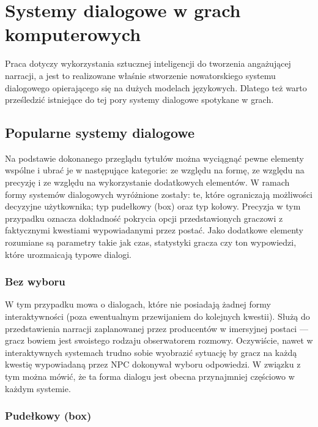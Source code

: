 \graphicspath{{chapters/chapter3/imgs/}}

\chapter{Systemy dialogowe w grach komputerowych}\label{section:ch3}

Praca dotyczy wykorzystania sztucznej inteligencji do tworzenia angażującej narracji, a jest
to realizowane właśnie stworzenie nowatorskiego systemu dialogowego opierającego się
na dużych modelach językowych. Dlatego też warto prześledzić istniejące do tej pory systemy
dialogowe spotykane w grach.

\section{Popularne systemy dialogowe}\label{subsection:ch3_1}

Na podstawie dokonanego przeglądu tytułów można wyciągnąć pewne elementy wspólne i ubrać je
w następujące kategorie: ze względu na formę, ze względu na precyzję i ze względu na wykorzystanie
dodatkowych elementów. W ramach formy systemów dialogowych wyróżnione zostały: te, które ograniczają
możliwości decyzyjne użytkownika; typ pudełkowy (box) oraz typ kołowy. Precyzja w tym przypadku
oznacza dokładność pokrycia opcji przedstawionych graczowi z faktycznymi kwestiami wypowiadanymi
przez postać. Jako dodatkowe elementy rozumiane są parametry takie jak czas, statystyki gracza
czy ton wypowiedzi, które urozmaicają typowe dialogi.

\subsection{Bez wyboru}

W tym przypadku mowa o dialogach, które nie posiadają żadnej formy interaktywności (poza
ewentualnym przewijaniem do kolejnych kwestii). Służą do przedstawienia narracji zaplanowanej
przez producentów w imersyjnej postaci --- gracz bowiem jest swoistego rodzaju obserwatorem
rozmowy. Oczywiście, nawet w interaktywnych systemach trudno sobie wyobrazić sytuację by gracz
na każdą kwestię wypowiadaną przez NPC dokonywał wyboru odpowiedzi. W związku z tym można mówić,
że ta forma dialogu jest obecna przynajmniej częściowo w każdym systemie.

\subsection{Pudełkowy (box)}

